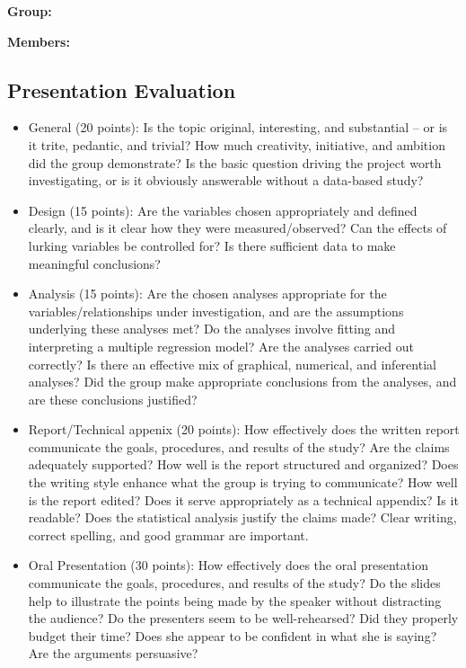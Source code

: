 \documentclass[11pt]{article}
\begin{document}

\noindent
{\bf Group:}

\vspace{.2in}

\noindent
{\bf Members:} 


\subsection*{Presentation Evaluation}

	\begin{itemize}
\itemsep2in
		\item General (20 points): Is the topic original, interesting, and substantial -- or is it trite, pedantic, and trivial?  How much creativity, initiative, and ambition did the group demonstrate?  Is the basic question driving the project worth investigating, or is it obviously answerable without a data-based study?
		\item Design (15 points):  Are the variables chosen appropriately and defined clearly, and is it clear how they were measured/observed?  Can the effects of lurking variables be controlled for?  Is there sufficient data to make meaningful conclusions? 
		\item Analysis (15 points):  Are the chosen analyses appropriate for the variables/relationships under investigation, and are the assumptions underlying these analyses met?  Do the analyses involve fitting and interpreting a multiple regression model?  Are the analyses carried out correctly?  Is there an effective mix of graphical, numerical, and inferential analyses?  Did the group make appropriate conclusions from the analyses, and are these conclusions justified?
		\item Report/Technical appenix (20 points):  How effectively does the written report communicate the goals, procedures, and results of the study?  Are the claims adequately supported? How well is the report structured and organized? Does the writing style enhance what the group is trying to communicate?  How well is the report edited? Does it serve appropriately as a technical appendix? Is it readable? Does the statistical analysis justify the claims made? Clear writing, correct spelling, and good grammar are important.
		\item Oral Presentation (30 points): How effectively does the oral presentation communicate the goals, procedures, and results of the study? Do the slides help to illustrate the points being made by the speaker without distracting the audience? Do the presenters seem to be well-rehearsed? Did they properly budget their time? Does she appear to be confident in what she is saying? Are the arguments persuasive? 
	\end{itemize}
\end{document}
